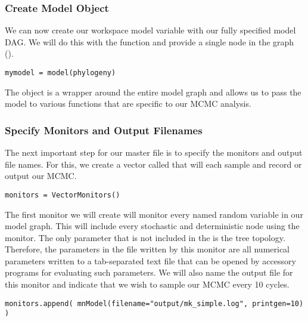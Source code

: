 \medskip
\subsubsection{Create Model Object}\label{subsub:Exercise-ModObj}

We can now create our workspace model variable with our fully specified model DAG. 
We will do this with the  function and provide a single node in the graph ().
{\tt \begin{snugshade*}
\begin{lstlisting}
mymodel = model(phylogeny)
\end{lstlisting}
\end{snugshade*}}

The object  is a wrapper around the entire model graph and allows us to pass the model to various functions that are specific to our MCMC analysis.

\medskip
\subsubsection{Specify Monitors and Output Filenames}\label{subsub:Exercise-Monitors}

The next important step for our master \Rev file is to specify the monitors and output file names.
For this, we create a vector called  that will each sample and record or output our MCMC. 


{\tt \begin{snugshade*}
\begin{lstlisting}
monitors = VectorMonitors()
\end{lstlisting}
\end{snugshade*}}

The first monitor we will create will monitor every named random variable in our model graph. 
This will include every stochastic and deterministic node using the  monitor.
The only parameter that is not included in the  is the tree topology. 
Therefore, the parameters in the file written by this monitor are all numerical parameters written to a tab-separated text file that can be opened by accessory programs for evaluating such parameters.
We will also name the output file for this monitor and indicate that we wish to sample our MCMC every 10 cycles.
{\tt \begin{snugshade*}
\begin{lstlisting}
monitors.append( mnModel(filename="output/mk_simple.log", printgen=10) )
\end{lstlisting}
\end{snugshade*}}

